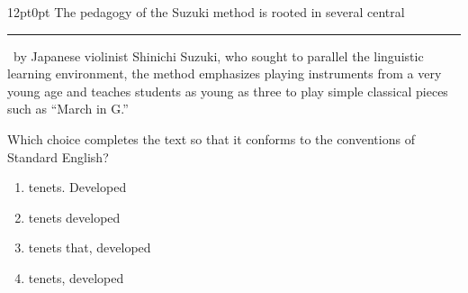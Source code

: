 \documentclass[11pt, twocolumn]{article}
\newcounter{questionnum}
\begin{document}
\vspace{6pt}\noindent
\begin{minipage}{\columnwidth}\raggedright
\noindent{}\par\vspace{8pt}
\begin{adjustwidth}{12pt}{0pt}
The pedagogy of the Suzuki method is rooted in several central \,\rule{2cm}{0.4pt}\, by Japanese violinist Shinichi Suzuki, who sought to parallel the linguistic learning environment, the method emphasizes playing instruments from a very young age and teaches students as young as three to play simple classical pieces such as ``March in G.''
\vspace{6pt}

Which choice completes the text so that it conforms to the conventions of Standard English?
\begin{enumerate}[label=\Alph*),leftmargin=18pt,topsep=3pt,itemsep=2pt]
  \item tenets. Developed
  \item tenets developed
  \item tenets that, developed
  \item tenets, developed
\end{enumerate}
\end{adjustwidth}
\end{minipage}\par
\end{document}
